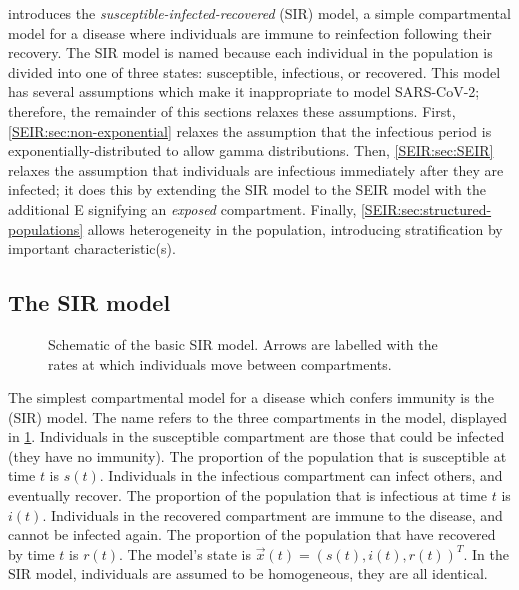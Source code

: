 \documentclass[thesis.tex]{subfiles}
\begin{document}
 introduces the \emph{susceptible-infected-recovered} (SIR) model, a simple compartmental model for a disease where individuals are immune to reinfection following their recovery.
The SIR model is named because each individual in the population is divided into one of three states: susceptible, infectious, or recovered.
This model has several assumptions which make it inappropriate to model SARS-CoV-2; therefore, the remainder of this sections relaxes these assumptions.
First, \cref{SEIR:sec:non-exponential} relaxes the assumption that the infectious period is exponentially-distributed to allow gamma distributions.
Then, \cref{SEIR:sec:SEIR} relaxes the assumption that individuals are infectious immediately after they are infected; it does this by extending the SIR model to the SEIR model with the additional E signifying an \emph{exposed} compartment.
Finally, \cref{SEIR:sec:structured-populations} allows heterogeneity in the population, introducing stratification by important characteristic(s).


\subsection{The SIR model} \label{SEIR:sec:SIR}

\begin{figure}[h]
  \caption[The SIR model]{Schematic of the basic SIR model. Arrows are labelled with the rates at which individuals move between compartments.}
  \label{SEIR:fig:SIR}
\end{figure}

The simplest compartmental model for a disease which confers immunity is the (SIR) model.
The name refers to the three compartments in the model, displayed in \cref{SEIR:fig:SIR}.
Individuals in the susceptible compartment are those that could be infected (they have no immunity).
The proportion of the population that is susceptible at time $t$ is $s(t)$.
Individuals in the infectious compartment can infect others, and eventually recover.
The proportion of the population that is infectious at time $t$ is $i(t)$.
Individuals in the recovered compartment are immune to the disease, and cannot be infected again.
The proportion of the population that have recovered by time $t$ is $r(t)$.
The model's state is $\vec{x}(t) = (s(t), i(t), r(t))^T$.
In the SIR model, individuals are assumed to be homogeneous, \ie they are all identical.
\end{document}
